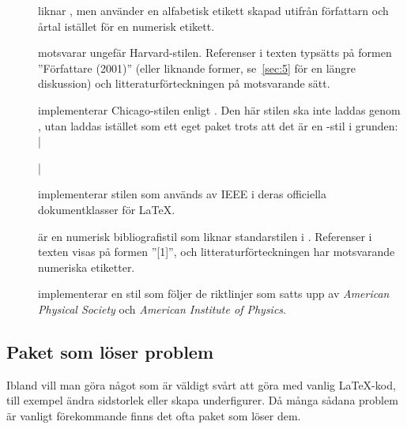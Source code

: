 \documentclass[10pt,../../a4.tex]{subfiles}
\begin{document}
\begin{description}
	\item[]
	liknar , men använder en alfabetisk etikett skapad
	utifrån författarn och årtal istället för en numerisk etikett.

	\item[]
	motsvarar ungefär Harvard-stilen. Referenser i texten typsätts på
	formen ”Författare (2001)” (eller liknande former, se~\cref{sec:5}
	för en längre diskussion) och litteraturförteckningen på motsvarande
	sätt.

	\item[]
	implementerar Chicago-stilen enligt \textcite{Chicago10}. Den här
	stilen ska inte laddas genom , utan laddas istället
	som ett eget paket trots att det är en -stil i grunden:
	\latex|\usepackage[authordate,backend=biber]{biblatex-chicago}|

	\item[]
	implementerar stilen som används av IEEE i deras officiella
	dokumentklasser för \LaTeX.

	\item[]
	är en numerisk bibliografistil som liknar standarstilen i \BibTeX.
	Referenser i texten visas på formen ”[1]”, och litteraturförteckningen
	har motsvarande numeriska etiketter.

	\item[]
	implementerar en stil som följer de riktlinjer som satts upp av
	\emph{American Physical Society} och \emph{American Institute
	of Physics}.
\end{description}

\subsection{Paket som löser problem}
Ibland vill man göra något som är väldigt svårt att göra med vanlig
\LaTeX-kod, till exempel ändra sidstorlek eller skapa underfigurer. Då
många sådana problem är vanligt förekommande finns det ofta paket som
löser dem.
\end{document}
